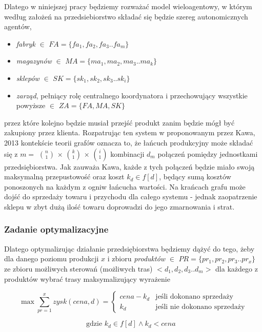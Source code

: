\documentclass{article}
\begin{document}
 Dlatego w niniejszej pracy będziemy rozważać model wieloagentowy, w którym według założeń na przedsiebiorstwo składać się będzie szereg autonomicznych agentów,
	\begin{itemize} 
		\item \textit{fabryk} $\in$ $FA = \{fa_1,fa_2,fa_3..fa_m\} $ 
		\item \textit{magazynów} $\in$ $MA = \{ma_1,ma_2,ma_3..ma_k\} $ 
		\item \textit{sklepów} $\in$ $SK = \{sk_1,sk_2,sk_3..sk_i\} $
		\item \textit{zarząd}, pełniący rolę centralnego koordynatora i przechowujący wszystkie powyższe $\in$ $ZA = \{FA,MA,SK\} $
	\end{itemize}

przez które kolejno będzie musiał przejść produkt zanim będzie mógł być zakupiony przez klienta. Rozpatrując ten system w proponowanym przez Kawa, 2013 kontekście teorii grafów oznacza to, że łańcuch produkcyjny może składać się z $m= $ $n\choose 1 $ $ \times $ $k\choose 1 $ $ \times $ $i\choose 1 $ kombinacji $d_m$ połączeń pomiędzy jednostkami przedsiębiorstwa. Jak zauważa Kawa, każde z tych połączeń będzie miało swoją maksymalną przepustowość oraz koszt $k_d \in f[d]$, będący sumą kosztów ponoszonych na każdym z ogniw łańcucha wartości. Na krańcach grafu może dojść do sprzedaży towaru i przychodu dla całego systemu - jednak zaopatrzenie sklepu w zbyt dużą ilość towaru doprowadzi do jego zmarnowania i strat. 

\subsubsection{Zadanie optymalizacyjne} 
Dlatego optymalizując działanie przedsiębiorstwa będziemy dążyć do tego, żeby dla danego poziomu produkcji $x$ i zbioru \textit{produktów} $\in$ $PR = \{pr_1,pr_2,pr_3..pr_x\} $ ze zbioru możliwych sterowań (możliwych tras) $<d_1,d_2,d_3..d_m>$ dla każdego z produktów wybrać trasy maksymalizujący wyrażenie

\begin{equation} \label{eq:teoria1}
\max \sum\limits_{pr=1}^x  zysk (cena,d) = \begin{cases}
cena - k_d &\text{jeśli dokonano sprzedaży}\\
k_d &\text{jeśli nie dokonano sprzedaży}
\end{cases}
\end{equation}

\begin{equation*}
 \text{gdzie $k_d \in f[d] \wedge k_d < cena $ }
\end{equation*}
\end{document}
